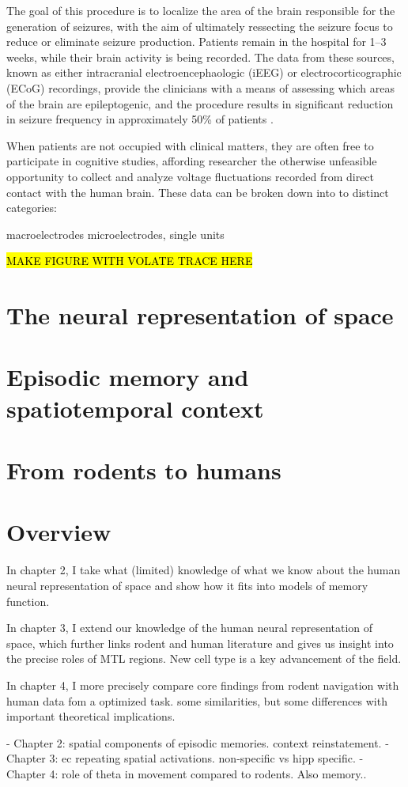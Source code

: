 The goal of this procedure is to localize the area of the brain responsible for the generation of seizures, with the aim of ultimately ressecting the seizure focus to reduce or eliminate seizure production. Patients remain in the hospital for 1--3 weeks, while their brain activity is being recorded. The data from these sources, known as either intracranial electroencephaologic (iEEG) or electrocorticographic (ECoG) recordings, provide the clinicians with a means of assessing which areas of the brain are epileptogenic, and the procedure results in significant reduction in seizure frequency in approximately 50\% of patients \citep{Kaha06}. 

When patients are not occupied with clinical matters, they are often free to participate in cognitive studies, affording researcher the otherwise unfeasible opportunity to collect and analyze voltage fluctuations recorded from direct contact with the human brain. These data can be broken down into to distinct categories: 

macroelectrodes 
microelectrodes, single units

\hl{MAKE FIGURE WITH VOLATE TRACE HERE}



\section{The neural representation of space}
\section{Episodic memory and spatiotemporal context}
\section{From rodents to humans}
\section{Overview}

In chapter 2, I take what (limited) knowledge of what we know about the human neural representation of space and show how it fits into models of memory function.

In chapter 3, I extend our knowledge of the human neural representation of space, which further links rodent and human literature and gives us insight into the precise roles of MTL regions. New cell type is a key advancement of the field.

In chapter 4, I more precisely compare core findings from rodent navigation with human data fom a optimized task. some similarities, but some differences with important theoretical implications.

- Chapter 2: spatial components of episodic memories. context reinstatement.
- Chapter 3: ec repeating spatial activations. non-specific vs hipp specific.
- Chapter 4: role of theta in movement compared to rodents. Also memory..
